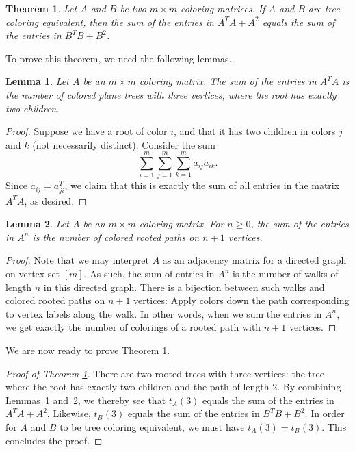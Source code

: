 \documentclass[12pt]{amsart}
\newtheorem{lemma}{Lemma}
\newtheorem{theorem}{Theorem}
\begin{document}
\begin{theorem} \label{prop:3mtns+3lines}
     Let $A$ and $B$ be two $m\times m$ coloring matrices. If $A$ and $B$ are tree coloring equivalent, then the sum of the entries in $A^T A+A^2$ equals the sum of the entries in $B^T B+B^2$.
\end{theorem}

To prove this theorem, we need the following lemmas.



\begin{lemma}\label{lem:3mtns}
Let $A$ be an $m\times m$ coloring matrix. The sum of the entries in $A^T A$ is the number of colored plane trees with three vertices, where the root has exactly two children.
\end{lemma}
\begin{proof}
    Suppose we have a root of color $i$, and that it has two children in colors $j$ and $k$ (not necessarily distinct). 
    Consider the sum
    \[
    \sum_{i=1}^m \sum_{j=1}^m \sum_{k=1}^m a_{ij}a_{ik}.
    \]
    Since $a_{ij}=a^T_{ji}$, 
    we claim that this is exactly the sum of all entries in the matrix $A^T A$, as desired.
\end{proof}
\begin{lemma}\label{lem:all_lines}
Let $A$ be an $m\times m$ coloring matrix. For $n\geq0$, the sum of the entries in $A^n$ is the number of colored rooted paths on $n+1$ vertices.
\end{lemma}
\begin{proof}
    Note that we may interpret $A$ 
    as an adjacency matrix for a directed graph on vertex set $[m]$. 
    As such, the sum of entries in $A^n$ is the number of walks of length $n$ in this directed graph. 
    There is a bijection between such walks and colored rooted paths on $n+1$ vertices: 
    Apply colors down the path corresponding to vertex labels along the walk. 
    In other words, when we sum the entries in $A^n$, we get exactly the number of colorings of a rooted path with $n+1$ vertices.
\end{proof}

We are now ready to prove Theorem \ref{prop:3mtns+3lines}.

\begin{proof}[Proof of Theorem \ref{prop:3mtns+3lines}]
    There are two rooted trees with three vertices: the tree where the root has exactly two children and the path of length $2$. By combining Lemmas~\ref{lem:3mtns} and~\ref{lem:all_lines}, we thereby see that $t_A(3)$ equals the sum of the entries in $A^TA+A^2$. Likewise, $t_B(3)$ equals the sum of the entries in $B^TB+B^2$. In order for $A$ and $B$ to be tree coloring equivalent, we must have $t_A(3)=t_B(3)$. 
    This concludes the proof.
\end{proof}
\end{document}
